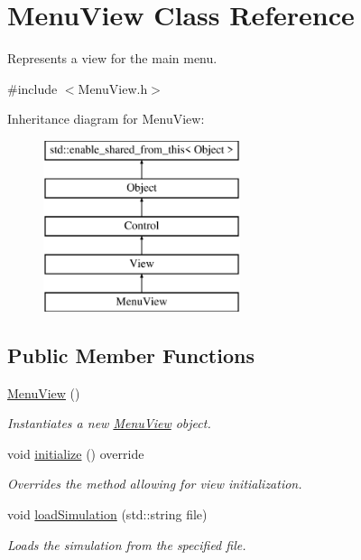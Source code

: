 \hypertarget{class_menu_view}{}\section{Menu\+View Class Reference}
\label{class_menu_view}


Represents a view for the main menu.  




{\ttfamily \#include $<$Menu\+View.\+h$>$}

Inheritance diagram for Menu\+View\+:\begin{figure}[H]
\begin{center}
\leavevmode
\includegraphics[height=5.000000cm]{class_menu_view}
\end{center}
\end{figure}
\subsection*{Public Member Functions}
\begin{DoxyCompactItemize}
\item 
\mbox{\hyperlink{class_menu_view_a56e295d58afed820591daa0fc49d3b8a}{Menu\+View}} ()
\begin{DoxyCompactList}\small\item\em Instantiates a new \mbox{\hyperlink{class_menu_view}{Menu\+View}} object. \end{DoxyCompactList}\item 
void \mbox{\hyperlink{class_menu_view_afeb1445373870a755eea4fe036351ba4}{initialize}} () override
\begin{DoxyCompactList}\small\item\em Overrides the method allowing for view initialization. \end{DoxyCompactList}\item 
void \mbox{\hyperlink{class_menu_view_a12f1c4322b521568524ba0abdb854a96}{load\+Simulation}} (std\+::string file)
\begin{DoxyCompactList}\small\item\em Loads the simulation from the specified file. \end{DoxyCompactList}\end{DoxyCompactItemize}
